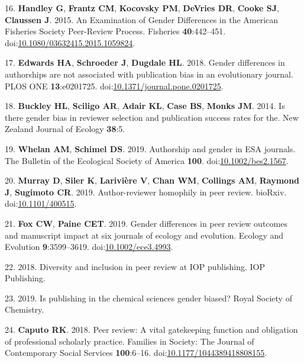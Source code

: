 \documentclass[11pt,]{article}
\begin{document}
\hypertarget{ref-handley_examination_2015}{}
16. \textbf{Handley G}, \textbf{Frantz CM}, \textbf{Kocovsky PM},
\textbf{DeVries DR}, \textbf{Cooke SJ}, \textbf{Claussen J}. 2015. An
Examination of Gender Differences in the American Fisheries Society
Peer-Review Process. Fisheries \textbf{40}:442--451.
doi:\href{https://doi.org/10.1080/03632415.2015.1059824}{10.1080/03632415.2015.1059824}.

\hypertarget{ref-edwards_gender_2018}{}
17. \textbf{Edwards HA}, \textbf{Schroeder J}, \textbf{Dugdale HL}.
2018. Gender differences in authorships are not associated with
publication bias in an evolutionary journal. PLOS ONE
\textbf{13}:e0201725.
doi:\href{https://doi.org/10.1371/journal.pone.0201725}{10.1371/journal.pone.0201725}.

\hypertarget{ref-buckley_is_2014}{}
18. \textbf{Buckley HL}, \textbf{Sciligo AR}, \textbf{Adair KL},
\textbf{Case BS}, \textbf{Monks JM}. 2014. Is there gender bias in
reviewer selection and publication success rates for the. New Zealand
Journal of Ecology \textbf{38}:5.

\hypertarget{ref-Whelan2019}{}
19. \textbf{Whelan AM}, \textbf{Schimel DS}. 2019. Authorship and gender
in ESA journals. The Bulletin of the Ecological Society of America
\textbf{100}.
doi:\href{https://doi.org/10.1002/bes2.1567}{10.1002/bes2.1567}.

\hypertarget{ref-Murray400515}{}
20. \textbf{Murray D}, \textbf{Siler K}, \textbf{Larivière V},
\textbf{Chan WM}, \textbf{Collings AM}, \textbf{Raymond J},
\textbf{Sugimoto CR}. 2019. Author-reviewer homophily in peer review.
bioRxiv. doi:\href{https://doi.org/10.1101/400515}{10.1101/400515}.

\hypertarget{ref-fox_gender_2019}{}
21. \textbf{Fox CW}, \textbf{Paine CET}. 2019. Gender differences in
peer review outcomes and manuscript impact at six journals of ecology
and evolution. Ecology and Evolution \textbf{9}:3599--3619.
doi:\href{https://doi.org/10.1002/ece3.4993}{10.1002/ece3.4993}.

\hypertarget{ref-Physics_2018}{}
22. 2018. Diversity and inclusion in peer review at IOP publishing. IOP
Publishing.

\hypertarget{ref-RoyalChem_2019}{}
23. 2019. Is publishing in the chemical sciences gender biased? Royal
Society of Chemistry.

\hypertarget{ref-Caputo2018}{}
24. \textbf{Caputo RK}. 2018. Peer review: A vital gatekeeping function
and obligation of professional scholarly practice. Families in Society:
The Journal of Contemporary Social Services \textbf{100}:6--16.
doi:\href{https://doi.org/10.1177/1044389418808155}{10.1177/1044389418808155}.
\end{document}
